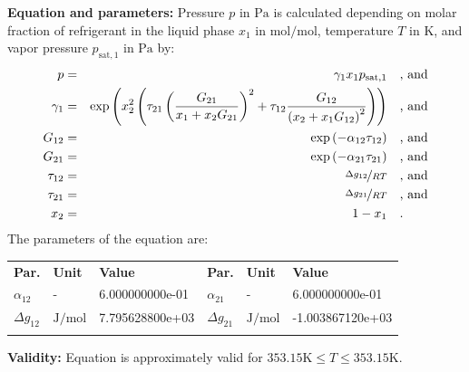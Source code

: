 \textbf{Equation and parameters:}
\newline
%
Pressure $p$ in $\si{\pascal}$ is calculated depending on molar fraction of refrigerant in the liquid phase $x_1$ in $\si{\mole\per\mole}$, temperature $T$ in $\si{\kelvin}$, and vapor pressure $p_\mathrm{sat,1}$ in $\si{\pascal}$ by:
%
\begin{equation*}
\begin{split}
p &=& \gamma_1 x_1 p_\mathrm{sat,1} & \quad\text{, and} \\
\gamma_1 &=& \exp \left( x_2^2 \left( \tau_{21} \left( \frac{G_{21}}{x_1 + x_2 G_{21}} \right) ^2 + \tau_{12} \frac{G_{12}}{\left( x_2 + x_1 G_{12} \right) ^2}\right) \right) & \quad\text{, and} \\
G_{12} &=& \exp \left( -\alpha_{12} \tau_{12} \right) & \quad\text{, and} \\
G_{21} &=& \exp \left( -\alpha_{21} \tau_{21} \right) & \quad\text{, and} \\
\tau_{12} &=& \nicefrac{\Delta g_{12}}{R T} & \quad\text{, and} \\
\tau_{21} &=& \nicefrac{\Delta g_{21}}{R T} & \quad\text{, and} \\
x_2 &=& 1 - x_1  & \quad\text{.} \\
\end{split}
\end{equation*}
%
The parameters of the equation are:
%
\begin{longtable}[l]{lll|lll}
\toprule
\addlinespace
\textbf{Par.} & \textbf{Unit} & \textbf{Value} &	\textbf{Par.} & \textbf{Unit} & \textbf{Value} \\
\addlinespace
\midrule
\endhead

\bottomrule
\endfoot
\bottomrule
\endlastfoot
\addlinespace

$\alpha_{12}$ & - & 6.000000000e-01 & $\alpha_{21}$ & - & 6.000000000e-01 \\
$\Delta g_{12}$ & $\si{\joule\per\mole}$ & 7.795628800e+03 & $\Delta g_{21}$ & $\si{\joule\per\mole}$ & -1.003867120e+03 \\

\addlinespace\end{longtable}

\textbf{Validity:}
\newline
Equation is approximately valid for $353.15 \si{\kelvin} \leq T \leq 353.15 \si{\kelvin}$.
\newline


